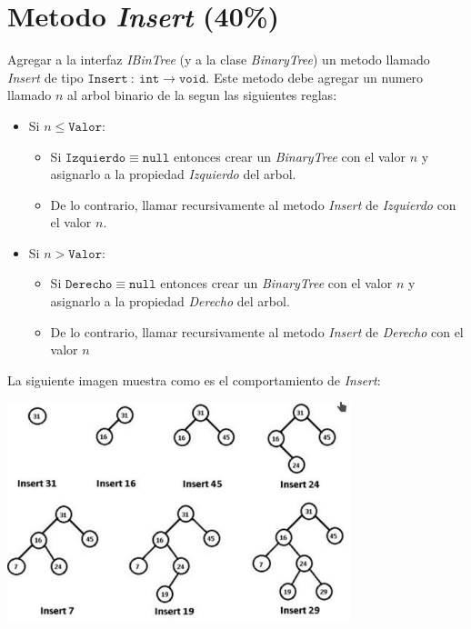 \documentclass{article}
\begin{document}
\section*{Metodo \emph{Insert} (40\%)}
Agregar a la interfaz \emph{IBinTree} (y a la clase \emph{BinaryTree}) un metodo llamado \emph{Insert} de
tipo $\mathtt{Insert}\ :\ \mathtt{int}\rightarrow\mathtt{void}$. Este metodo debe agregar un
numero llamado $n$ al arbol binario de la segun las siguientes reglas:
\begin{itemize}
        \item{Si $n\leq\mathtt{Valor}$:
                \begin{itemize}
                        \item{Si $\mathtt{Izquierdo} \equiv \mathtt{null}$ entonces crear un \emph{BinaryTree} con
                        el valor $n$ y asignarlo a la propiedad \emph{Izquierdo} del arbol.}
                        \item{De lo contrario, llamar recursivamente al metodo \emph{Insert} de \emph{Izquierdo} con el valor $n$.}
                \end{itemize}}
        \item{Si $n>\mathtt{Valor}$:
                \begin{itemize}
                        \item{Si $\mathtt{Derecho}\equiv\mathtt{null}$ entonces crear un \emph{BinaryTree}
                        con el valor $n$ y asignarlo a la propiedad \emph{Derecho} del arbol.}
                        \item{De lo contrario, llamar recursivamente al metodo \emph{Insert} de \emph{Derecho} con el valor $n$}
                \end{itemize}}
\end{itemize}
La siguiente imagen muestra como es el comportamiento de \emph{Insert}:
\begin{center}
        \includegraphics[width=10cm]{bstree.png}
\end{center}
\end{document}
